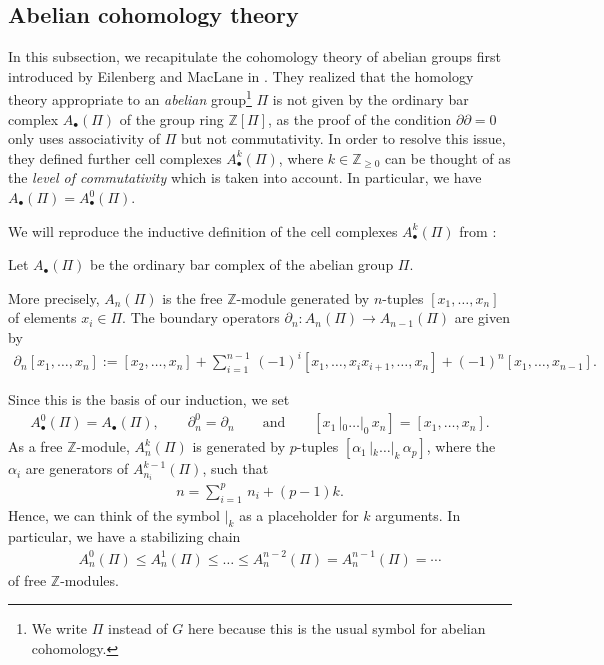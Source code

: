 \documentclass[10pt,a4paper]{amsart}
\numberwithin{equation}{section}
\newcommand{\ZZ }{\mathbb{Z}}
\begin{document}
\subsection{Abelian cohomology theory}

In this subsection, we recapitulate the cohomology theory of abelian groups first introduced by Eilenberg and MacLane in \cite{Eilenberg1950, Eilenberg1950a, MacLane1952}. They realized that the homology theory appropriate to an \textit{abelian} group\footnote{We write $\Pi$ instead of $G$ here because this is the usual symbol for abelian cohomology.} $\Pi$ is not given by the ordinary bar complex $A_\bullet(\Pi)$ of the group ring $\ZZ[\Pi]$, as the proof of the condition $\partial \partial=0$ only uses associativity of $\Pi$ but not commutativity. In order to resolve this issue, they defined further cell complexes $A^k_\bullet(\Pi)$, where $k \in \ZZ_{\geq 0}$ can be thought of as the \textit{level of commutativity} which is taken into account. In particular, we have $A_\bullet(\Pi)=A^0_\bullet(\Pi)$.

We will reproduce the inductive definition of the cell complexes $A^k_\bullet(\Pi)$ from \cite{Eilenberg1950a}:

Let $A_\bullet(\Pi)$ be the ordinary bar complex of the abelian group $\Pi$.

More precisely, $A_n(\Pi)$ is the free $\ZZ$-module generated by $n$-tuples $[x_1,\dots,x_n]$ of elements $x_i \in \Pi$. The boundary operators $\partial_n\colon A_n(\Pi) \to A_{n-1}(\Pi)$ are given by
\begin{align*}
 \partial_n [x_1,\dots,x_n] := [x_2, \dots,x_n] + \sum_{i=1}^{n-1}\,(-1)^i [x_1, \dots,x_{i}x_{i+1},\dots,x_n] + (-1)^n[x_1,\dots,x_{n-1}].
\end{align*}

Since this is the basis of our induction, we set
\begin{align*}
 A^0_\bullet(\Pi)=A_\bullet(\Pi), \qquad \partial^0_n = \partial_n \qquad \text{and} \qquad [x_1 \, |_0 \dots |_0 \, x_n]=[x_1, \dots , x_n].
\end{align*}
As a free $\ZZ$-module, $A^k_n(\Pi)$ is generated by $p$-tuples $[\alpha_1 \, |_k \dots |_k \, \alpha_p]$, where the $\alpha_i$ are generators of $A^{k-1}_{n_i}(\Pi)$, such that
\begin{align*}
 n= \sum_{i=1}^p \,n_i + (p-1)k.
\end{align*}
Hence, we can think of the symbol $|_k$ as a placeholder for $k$ arguments. In particular, we have a stabilizing chain
\begin{align}\label{eq: chain of cell complexes}
 A^0_n(\Pi) \leq A^1_n(\Pi) \leq \dots \leq A^{n-2}_n(\Pi) = A^{n-1}_n(\Pi) = \cdots
\end{align}
of free $\ZZ$-modules.
\end{document}
